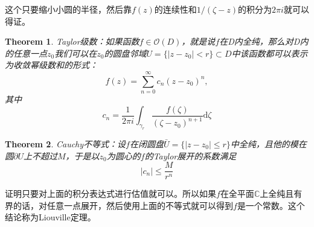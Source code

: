 \documentclass[10pt]{book}
\theoremstyle{plain}%
\newtheorem{theo}{Theorem}[chapter]%
\begin{document}
这个只要缩小小圆的半径，然后靠$f(z)$的连续性和$1/(\zeta -z)$的积分为$2\pi i$就可以得证。
\begin{theo}
	Taylor级数：如果函数$f \in \mathcal{O}(D)$，就是说$f$在D内全纯，那么对D内的任意一点$z_0$我们可以在$z_0$的圆盘邻域$U=\{|z-z_0|<r\}\subset D$中该函数都可以表示为收敛幂级数和的形式：
	\[
		f(z)=\sum_{n=0}^\infty c_n(z-z_0)^n,
	\]
其中
	\[
		c_n=\frac{1}{2\pi i}\int_{\gamma_r}\frac{f(\zeta)}{(\zeta -z_0)^{n+1}}\mathrm{d}\zeta
	\]
\end{theo}

\begin{theo}
	Cauchy不等式：设$f$在闭圆盘$\bar{U}=\{|z-z_0|\leq r\}$中全纯，且他的模在圆$\partial U$上不超过$M$，于是以$z_0$为圆心的$f$的Taylor展开的系数满足
	\[|c_n|\leq \frac{M}{r^n}\]
\end{theo}
证明只要对上面的积分表达式进行估值就可以。所以如果$f$在全平面$\mathbb{C}$上全纯且有界的话，对任意一点展开，然后使用上面的不等式就可以得到$f$是一个常数。这个结论称为Liouville定理。
\end{document}
